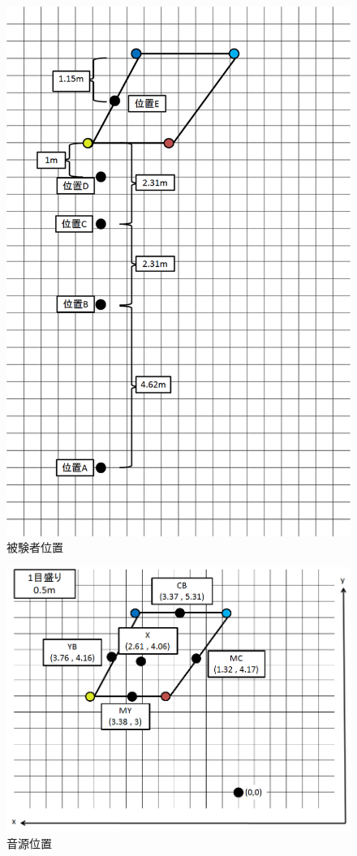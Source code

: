 \begin{figure}[p]
  \centering
  \includegraphics[clip,width=1.05\hsize]{img/hikenshaichi.png}
  \caption{被験者位置}\label{fig:hikenshaichi}
\end{figure}


\begin{figure}[p]
  \centering
  \includegraphics[clip,width=1.05\hsize]{img/ongenichi.png}
  \caption{音源位置}\label{fig:ongenichi}
\end{figure}




